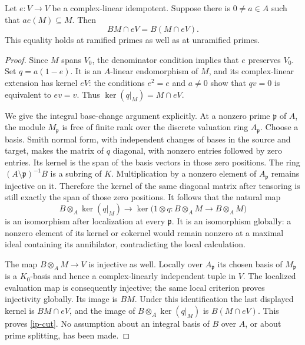\begin{lemma}\label{ip-intersection}
Let $e:V\to V$ be a complex-linear idempotent. Suppose there is
$0\ne a\in A$ such that $ae(M)\subseteq M$. Then
\begin{equation}\label{ip-cut}
                 BM\cap eV=B(M\cap eV).
\end{equation}
This equality holds at ramified primes as well as at unramified primes.
\end{lemma}
\begin{proof}
Since $M$ spans $V_0$, the denominator condition implies that $e$
preserves $V_0$. Set $q=a(1-e)$. It is an $A$-linear endomorphism
of $M$, and its complex-linear extension has kernel $eV$: the
conditions $e^2=e$ and $a\ne0$ show that $qv=0$ is equivalent to
$ev=v$. Thus $\ker(q|_M)=M\cap eV$.

We give the integral base-change argument explicitly. At a nonzero
prime $\mathfrak p$ of $A$, the module $M_{\mathfrak p}$ is free
of finite rank over the discrete valuation ring $A_{\mathfrak p}$.
Choose a basis. Smith normal form, with independent changes of bases
in the source and target, makes the matrix of $q$ diagonal, with
nonzero entries followed by zero entries. Its kernel is the span of
the basis vectors in those zero positions.
The ring $(A\setminus\mathfrak p)^{-1}B$ is a subring of $K$.
Multiplication by a nonzero element of $A_{\mathfrak p}$ remains
injective on it. Therefore the kernel of the same diagonal matrix
after tensoring is still exactly the span of those zero positions.
It follows that the natural map
\[
 B\otimes_A\ker(q|_M)\longrightarrow
          \ker\bigl(1\otimes q:B\otimes_A M\to B\otimes_A M\bigr)
\]
is an isomorphism after localization at every $\mathfrak p$.
It is an isomorphism globally: a nonzero element of its kernel or
cokernel would remain nonzero at a maximal ideal containing its
annihilator, contradicting the local calculation.

The map $B\otimes_A M\to V$ is injective as well. Locally over
$A_{\mathfrak p}$ its chosen basis of $M_{\mathfrak p}$ is a
$K_0$-basis and hence a complex-linearly independent tuple in $V$.
The localized evaluation map is consequently injective; the same
local criterion proves injectivity globally. Its image is $BM$.
Under this identification the last displayed kernel is $BM\cap eV$,
and the image of $B\otimes_A\ker(q|_M)$ is $B(M\cap eV)$.
This proves \eqref{ip-cut}. No assumption about an integral basis
of $B$ over $A$, or about prime splitting, has been made.
\end{proof}

